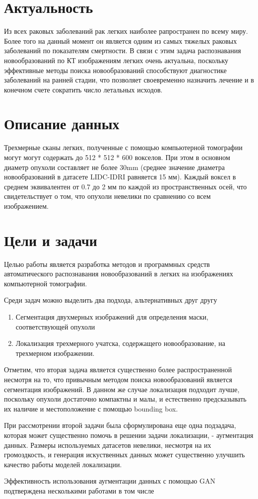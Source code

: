 
\section{Актуальность}

Из всех раковых заболеваний рак легких наиболее рапространен по всему миру. Более того
на данный момент он является одним из самых тяжелых раковых заболеваний по показателям смертности. В связи с этим задача распознавания новообразований по КТ изображениям легких очень актуальна, поскольку эффективные методы поиска новообразований способствуют диагностике заболеваний на ранней стадии, что позволяет своевременно назначить лечение и в конечном счете сократить число летальных исходов.

\section{Описание данных}

Трехмерные сканы легких, полученные с помощью компьютерной томографии могут могут содержать до 512 * 512 * 600 вокселов. При этом в основном диаметр опухоли составляет не более 30mm (среднее значение диаметра новообразований в датасете LIDC-IDRI \cite{lidc} равняется 15 мм). Каждый воксел в среднем эквивалентен от 0.7 до 2 мм по каждой из пространственных осей, что свидетельствует о том, что опухоли невелики по сравнению со всем изображением.

\section{Цели и задачи}

Целью работы является разработка методов и программных средств автоматического распознавания новообразований в легких на изображениях компьютерной томографии. 

Среди задач можно выделить два подхода, альтернативных друг другу

\begin{enumerate}
    \item Сегментация двухмерных изображений для определения маски, соответствующей опухоли
    \item Локализация трехмерного учатска, содержащего новообразование, на трехмерном изображении.
\end{enumerate}

Отметим, что вторая задача является существенно более распространенной несмотря на то, что
привычным методом поиска новообразований является сегментация изображений. В данном же случае локализация подходит лучше, поскольку опухоли достаточно компактны и малы, и естественно предсказывать их наличие и местоположение с помощью bounding box.

При рассмотрении второй задачи была сформулирована еще одна подзадача, которая может существенно помочь в решении задачи локализации, - аугментация данных. Размеры используемых датасетов невелики, несмотря на их громоздкость, и генерация искуственных данных может существенно улучшить качество работы моделей локализации.

Эффективность использования аугментации данных с помощью GAN подтверждена несколькими работами в том числе \cite{han2019synthesizing} \cite{wgan-augmentation-2} \cite{wgan-augmentation}
